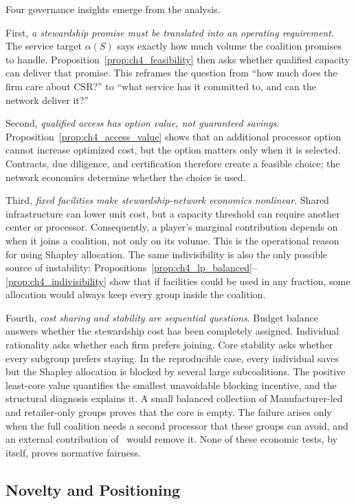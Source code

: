 Four governance insights emerge from the analysis.

First, \emph{a stewardship promise must be translated into an operating requirement}. The service target $\alpha(S)$ says exactly how much volume the coalition promises to handle. Proposition~\ref{prop:ch4_feasibility} then asks whether qualified capacity can deliver that promise. This reframes the question from ``how much does the firm care about CSR?'' to ``what service has it committed to, and can the network deliver it?''

Second, \emph{qualified access has option value, not guaranteed savings}. Proposition~\ref{prop:ch4_access_value} shows that an additional processor option cannot increase optimized cost, but the option matters only when it is selected. Contracts, due diligence, and certification therefore create a feasible choice; the network economics determine whether the choice is used.

Third, \emph{fixed facilities make stewardship-network economics nonlinear}. Shared infrastructure can lower unit cost, but a capacity threshold can require another center or processor. Consequently, a player's marginal contribution depends on when it joins a coalition, not only on its volume. This is the operational reason for using Shapley allocation. The same indivisibility is also the only possible source of instability: Propositions~\ref{prop:ch4_lp_balanced}--\ref{prop:ch4_indivisibility} show that if facilities could be used in any fraction, some allocation would always keep every group inside the coalition.

Fourth, \emph{cost sharing and stability are sequential questions}. Budget balance answers whether the stewardship cost has been completely assigned. Individual rationality asks whether each firm prefers joining. Core stability asks whether every subgroup prefers staying. In the reproducible case, every individual saves but the Shapley allocation is blocked by several large subcoalitions. The positive least-core value quantifies the smallest unavoidable blocking incentive, and the structural diagnosis explains it. A small balanced collection of Manufacturer-led and retailer-only groups proves that the core is empty. The failure arises only when the full coalition needs a second processor that these groups can avoid, and an external contribution of \ChFourCostOfStability\ would remove it. None of these economic tests, by itself, proves normative fairness.

\subsection{Novelty and Positioning}


